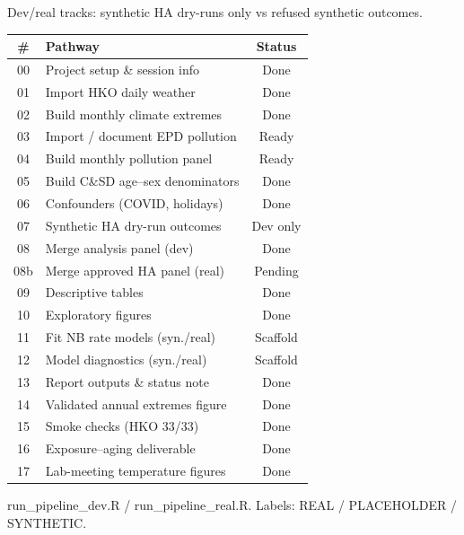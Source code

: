 \documentclass[11pt]{article}
\begin{document}
\begin{minipage}[t]{0.327\textwidth}
\begin{tcolorbox}[enhanced,colback=Panel,colframe=Teal!60,boxrule=0.8pt,arc=0pt,left=2.5mm,right=2.5mm,top=2.5mm,bottom=2.5mm,width=\linewidth,height=778mm,valign=top,before skip=0pt,after skip=0pt]
\begin{tcolorbox}
Dev/real tracks: synthetic HA dry-runs only vs refused synthetic outcomes.
{\fontsize{8.5}{10.1}\selectfont\renewcommand{\arraystretch}{1.02}
\begin{tabular}{@{}c p{7.8cm} c@{}}
\toprule
\textbf{\#}&\textbf{Pathway}&\textbf{Status}\\
\midrule
00 & Project setup \& session info & Done \\
01 & Import HKO daily weather & Done \\
02 & Build monthly climate extremes & Done \\
03 & Import / document EPD pollution & Ready \\
04 & Build monthly pollution panel & Ready \\
05 & Build C\&SD age--sex denominators & Done \\
06 & Confounders (COVID, holidays) & Done \\
07 & Synthetic HA dry-run outcomes & Dev only \\
08 & Merge analysis panel (dev) & Done \\
08b & Merge approved HA panel (real) & Pending \\
09 & Descriptive tables & Done \\
10 & Exploratory figures & Done \\
11 & Fit NB rate models (syn./real) & Scaffold \\
12 & Model diagnostics (syn./real) & Scaffold \\
13 & Report outputs \& status note & Done \\
14 & Validated annual extremes figure & Done \\
15 & Smoke checks (HKO 33/33) & Done \\
16 & Exposure--aging deliverable & Done \\
17 & Lab-meeting temperature figures & Done \\
\bottomrule
\end{tabular}}
{\color{Muted}\fontsize{7.8}{9.2}\selectfont\textsf{run\_pipeline\_dev.R} / \textsf{run\_pipeline\_real.R}. Labels: REAL / PLACEHOLDER / SYNTHETIC.\par}

\end{tcolorbox}

\begin{tcolorbox}[enhanced,colback=Panel,colframe=Teal,boxrule=0.85pt,arc=1.2pt,left=6pt,right=6pt,top=4pt,bottom=4pt,coltitle=white,fonttitle=\bfseries\fontsize{12.5}{14}\selectfont,attach boxed title to top left={yshift=-1.5mm,xshift=3.5mm},boxed title style={colback=Teal,colframe=Teal,arc=1pt,boxrule=0pt,left=4.5pt,right=4.5pt,top=1pt,bottom=1pt},title={11. Monthly hot nights vs cold days (REAL)},before skip=0pt,after skip=1.5mm,width=\linewidth]
\RaggedRight\fontsize{9.8}{11.6}\selectfont


\end{tcolorbox}
\end{tcolorbox}
\end{minipage}
\end{document}
